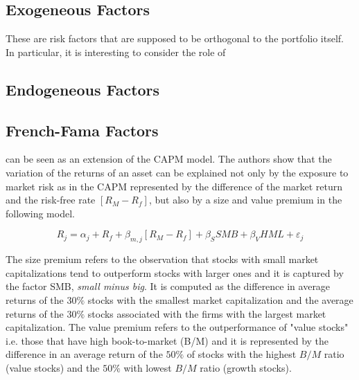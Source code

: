 \documentclass[hidelinks,11pts]{article}
\DeclareMathOperator{\1}{\mathbbm{1}}
\begin{document}
        \subsection{Exogeneous Factors}
These are risk factors that are supposed to be orthogonal to the portfolio itself. 
In particular, it is interesting to consider the role of 



        \subsection{Endogeneous Factors}





        \subsection{French-Fama Factors}

\cite{famaCommonRiskFactors1993} can be seen as an extension of the CAPM model. 
The authors show that the variation of the returns of an asset can be explained not only by the exposure to market risk as in the CAPM represented by the difference of the market return and the risk-free rate $[R_M-R_f]$, but also by a size and value premium in the following model.
    
    \begin{equation}
        R_j = \alpha_j + R_f + \beta_{m,j}[R_M-R_f] +\beta_{S} SMB + \beta_{V}HML +\varepsilon_j
    \end{equation}

The size premium refers to the observation that stocks with small market capitalizations tend to outperform stocks with larger ones and it is captured by the factor SMB, \emph{small minus big}.
It is computed as the difference in average returns of the $30\%$ stocks with the smallest market capitalization and the average returns of the $30\%$ stocks associated with the firms with the largest market capitalization. 
The value premium refers to the outperformance of "value stocks" i.e. those that have high book-to-market (B/M) and it is represented by the difference in an average return of the $50\%$ of stocks with the highest $B/M$ ratio (value stocks) and the $50\%$ with lowest $B/M$ ratio (growth stocks). 
\end{document}
